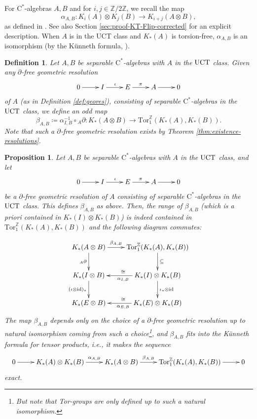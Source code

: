 \documentclass[a4paper,10pt]{amsart}
\newcommand{\T}[1]{\textup{#1}}
\newcommand{\cstar}{\ensuremath{\mathrm C^\ast}}
\newcounter{theorem}
\newtheorem{prop}[theorem]{Proposition}
\newtheorem{defn}[theorem]{Definition}
\numberwithin{equation}{section}
\numberwithin{theorem}{section}
\newcommand{\Z}{\mathbb{Z}}
\newcommand{\Tor}{\mathrm{Tor}_1^{\Z}}
\newcommand{\id}{\mathrm{id}}
\begin{document}
For $\cstar$-algebras $A,B$ and for $i,j \in \Z/2\Z$, we recall the map 
$$
	\alpha_{A,B}:K_i(A)\otimes K_j(B) \to K_{i+j}(A\otimes B), $$ 
	as defined in \cite[Chapter 23]{Blackadar:KBook}. See also Section \ref{sec:proof-KT-Flip-corrected} for an explicit description.
When $A$ is in the UCT class and $K_*(A)$ is torsion-free, $\alpha_{A,B}$ is an isomorphism (by the K\"unneth formula, \cite[Theorem 23.3.1]{Blackadar:KBook}).

\begin{defn}
	\label{def:beta}
	Let $A,B$ be separable $\cstar$-algebras with $A$ in the $\T{UCT}$ class.  Given any $\partial$-free geometric resolution 
	\[
		\xymatrix{
			0 \ar[r] & I \ar[r]^\iota & E \ar[r]^\pi & A \ar[r]  & 0
		}
	\]
	of $A$ (as in Definition \ref{def:geores}), consisting of separable $\cstar$-algebras in the $\T{UCT}$ class, we define an odd map 
	\[
			\beta_{A,B} \coloneqq \alpha_{I,B}^{-1}\circ {}_A\partial \colon K_*(A \otimes B) \to \Tor(K_*(A),K_*(B)).
	\]
	Note that such a $\partial$-free geometric resolution exists by Theorem \ref{thm:existence-resolutions}.
\end{defn}

\begin{prop}
\label{prop:kunnethformula}
Let $A,B$ be separable $\cstar$-algebras with $A$ in the $\T{UCT}$ class, and let
	\[
		\xymatrix{
			0 \ar[r] & I \ar[r]^\iota & E \ar[r]^\pi & A \ar[r]  & 0
		}
	\]
	be a  $\partial$-free geometric resolution of $A$ consisting of separable $\cstar$-algebras in the $\T{UCT}$ class. This defines $\beta_{A,B}$ as above.
	Then, the range of $\beta_{A,B}$ (which is a priori contained in $K_*(I)\otimes K_*(B)$) is indeed contained in $\Tor(K_*(A),K_*(B))$ and the following diagram commutes:

\begin{equation}
	\label{eq:kunnethformula}
	\begin{aligned}
	\xymatrix{
	K_*(A \otimes B) \ar[r]^-{\beta_{A,B}} \ar[d]_{ {}_A \partial}  & \Tor(K_*(A),K_*(B)) \ar[d]^\subseteq \\
		K_*(I \otimes B) \ar[d]_{(\iota \otimes \id)_*} & K_*(I) \otimes K_*(B) \ar[d]^{\iota_* \otimes \id} \ar[l]^{\alpha_{I,B}}_\cong \\
		K_*(E \otimes B) & K_*(E) \otimes K_*(B) \ar[l]^{\alpha_{E,B}}_\cong
	}
	\end{aligned}
\end{equation}
	The map $\beta_{A,B}$ depends only on the choice of a $\partial$-free geometric resolution up to natural isomorphism coming from such a choice\footnote{But note that Tor-groups are only defined up to such a natural isomorphism.},
	and $\beta_{A,B}$ fits into the K\"unneth formula for tensor products, i.e., it makes the sequence 
	\[
		\xymatrix{
			 0 \ar[r] & K_*(A) \otimes K_*(B) \ar[r]^-{\alpha_{A,B}} & K_*(A \otimes B) \ar[r]^-{\beta_{A,B}} & \Tor(K_*(A),K_*(B)) \ar[r] & 0
		}
	\]
	exact.
\end{prop}
\end{document}
